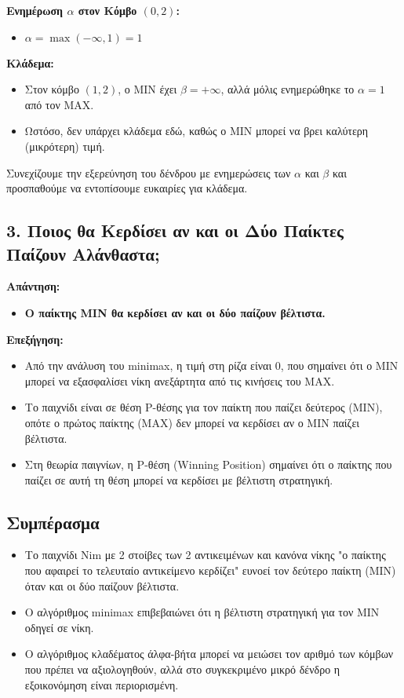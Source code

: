 \documentclass{article}
\begin{document}
\textbf{Ενημέρωση \(\alpha\) στον Κόμβο $(0, 2)$:}
\begin{itemize}
    \item \(\alpha = \max(-\infty, 1) = 1\)
\end{itemize}

\textbf{Κλάδεμα:}
\begin{itemize}
    \item Στον κόμβο $(1, 2)$, ο MIN έχει \(\beta = +\infty\), αλλά μόλις ενημερώθηκε το \(\alpha = 1\) από τον MAX.
    \item Ωστόσο, δεν υπάρχει κλάδεμα εδώ, καθώς ο MIN μπορεί να βρει καλύτερη (μικρότερη) τιμή.
\end{itemize}

Συνεχίζουμε την εξερεύνηση του δένδρου με ενημερώσεις των \(\alpha\) και \(\beta\) και προσπαθούμε να εντοπίσουμε ευκαιρίες για κλάδεμα.

\subsection*{3. Ποιος θα Κερδίσει αν και οι Δύο Παίκτες Παίζουν Αλάνθαστα;}

\textbf{Απάντηση:}
\begin{itemize}
    \item \textbf{Ο παίκτης MIN θα κερδίσει αν και οι δύο παίζουν βέλτιστα.}
\end{itemize}

\textbf{Επεξήγηση:}
\begin{itemize}
    \item Από την ανάλυση του minimax, η τιμή στη ρίζα είναι \(0\), που σημαίνει ότι ο MIN μπορεί να εξασφαλίσει νίκη ανεξάρτητα από τις κινήσεις του MAX.
    \item Το παιχνίδι είναι σε θέση P-θέσης για τον παίκτη που παίζει δεύτερος (MIN), οπότε ο πρώτος παίκτης (MAX) δεν μπορεί να κερδίσει αν ο MIN παίζει βέλτιστα.
    \item Στη θεωρία παιγνίων, η P-θέση (Winning Position) σημαίνει ότι ο παίκτης που παίζει σε αυτή τη θέση μπορεί να κερδίσει με βέλτιστη στρατηγική.
\end{itemize}

\subsection*{Συμπέρασμα}

\begin{itemize}
    \item Το παιχνίδι Nim με 2 στοίβες των 2 αντικειμένων και κανόνα νίκης "ο παίκτης που αφαιρεί το τελευταίο αντικείμενο κερδίζει" ευνοεί τον δεύτερο παίκτη (MIN) όταν και οι δύο παίζουν βέλτιστα.
    \item Ο αλγόριθμος minimax επιβεβαιώνει ότι η βέλτιστη στρατηγική για τον MIN οδηγεί σε νίκη.
    \item Ο αλγόριθμος κλαδέματος άλφα-βήτα μπορεί να μειώσει τον αριθμό των κόμβων που πρέπει να αξιολογηθούν, αλλά στο συγκεκριμένο μικρό δένδρο η εξοικονόμηση είναι περιορισμένη.
\end{itemize}
\end{document}
